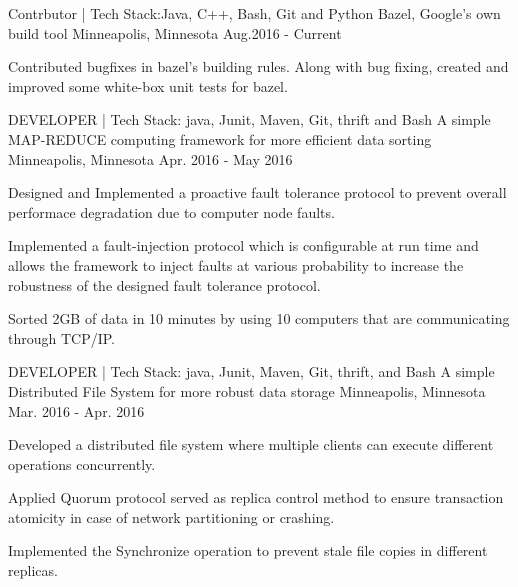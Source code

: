 \begin{cventries}
  \cventry
    { Contrbutor \enskip | \enskip Tech Stack:Java, C++, Bash, Git and Python} %
    {Bazel, Google's own build tool} %
    {Minneapolis, Minnesota} %
    {Aug.2016 - Current} %
    {
      \begin{cvitems} %
        \item {Contributed bugfixes in bazel's building rules. Along with bug fixing, created and improved some white-box unit tests for bazel.}
      \end{cvitems}
    }

  \cventry
    { DEVELOPER \enskip | \enskip Tech Stack: java, Junit, Maven, Git, thrift and Bash} %
    {A simple MAP-REDUCE computing framework for more efficient data sorting} %
    {Minneapolis, Minnesota} %
    {Apr. 2016 - May 2016} %
    {
      \begin{cvitems} %
        \item {Designed and Implemented a proactive fault tolerance protocol to prevent overall performace degradation due to computer node faults.}
        \item {Implemented a fault-injection protocol which is configurable at run time and allows the framework to inject faults at various probability to
increase the robustness of the designed fault tolerance protocol.}
        \item {Sorted 2GB of data in 10 minutes by using 10 computers that are communicating through TCP/IP.}
      \end{cvitems}
    }

  \cventry
    {DEVELOPER \enskip | \enskip Tech Stack: java, Junit, Maven, Git, thrift, and Bash} %
    {A simple Distributed File System for more robust data storage} %
    {Minneapolis, Minnesota} %
    {Mar. 2016 - Apr. 2016} %
    {
      \begin{cvitems} %
        \item {Developed a distributed file system where multiple clients can execute different operations concurrently.}
        \item {Applied Quorum protocol served as replica control method to ensure transaction atomicity in case of network partitioning or crashing.}
        \item {Implemented the Synchronize operation to prevent stale file copies in different replicas.}
      \end{cvitems}
    }


\end{cventries}
